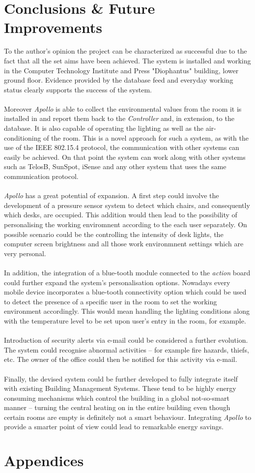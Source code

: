 \documentclass[12pt,a4paper]{report}
\begin{document}
\chapter{Conclusions \& Future Improvements}
%
To the author's opinion the project can be characterized as successful due to the fact that all the set aims have been achieved.
The system is installed and working in the Computer Technology Institute and Press "Diophantus" building, lower ground floor.
Evidence provided by the database feed and everyday working status clearly supports the success of the system.\\
\ \\
Moreover \emph{Apollo} is able to collect the environmental values from the room it is installed in and report them back to the \textit{Controller} and, in extension, to the database.
It is also capable of operating the lighting as well as the air-conditioning of the room.
This is a novel approach for such a system, as with the use of the IEEE 802.15.4 protocol, the communication with other systems can easily be achieved.
On that point the system can work along with other systems such as TelosB, SunSpot, iSense and any other system that uses the same communication protocol. \\
\ \\
\emph{Apollo} has a great potential of expansion.
A first step could involve the development of a pressure sensor system to detect which chairs, and consequently which desks, are occupied.
This addition would then lead to the possibility of personalising the working enviromnent according to the each user separately.
On possible scenario could be the controlling the intensity of desk lights, the computer screen brightness and all those work environmnent settings which are very personal. \\
\ \\
In addition, the integration of a blue-tooth module connected to the \textit{action} board could further expand the system's personalisation options.
Nowadays every mobile device incorporates a blue-tooth connectivity option which could be used to detect the presence of a specific user in the room to set the working environment accordingly.
This would mean handling the lighting conditions along with the temperature level to be set upon user's entry in the room, for example. \\
\ \\
Introduction of security alerts via e-mail could be considered a further evolution.
The system could recognise abnormal activities -- for example fire hazards, thiefs, etc.
The owner of the office could then be notified for this activity via e-mail.\\
\ \\
Finally, the devised system could be further developed to fully integrate itself with existing Building Management Systems.
These tend to be highly energy consuming mechanisms which control the building in a global not-so-smart manner -- turning the central heating on in the entire building even though certain rooms are empty is definitely not a smart behaviour.
Integrating \emph{Apollo} to provide a smarter point of view could lead to remarkable energy savings.
%
\newpage
%


%
\newpage
%
\chapter*{Appendices}
%
\end{document}
